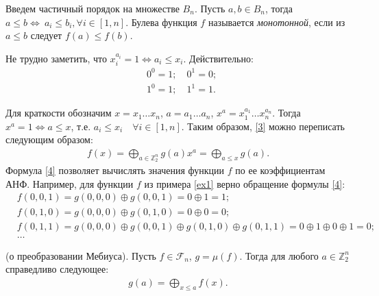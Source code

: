 Введем частичный порядок на множестве $B_n$. Пусть $a,b \in B_n$, тогда ${a} \leq {b} \Leftrightarrow \ a_i \leq b_i, \forall i \in [1,n]$.
Булева функция $f$ называется \textit{монотонной}, если из ${a}\leq {b}$ следует $f({a}) \leq f({b})$.

Не трудно заметить, что $x_i^{a_i} = 1 \Leftrightarrow a_i \leq x_i$. Действительно:
\begin{align*}
    &0^0 = 1;\quad0^1 =0;\\
    &1^0= 1;\quad 1^1=1.
\end{align*}

Для краткости обозначим $x = x_1\dots x_n$, $a = a_1 \dots a_n$, $x^a=x_1^{a_1} \dots x_n^{a_n}$.
Тогда $x^a = 1 \Leftrightarrow a \leq x$, т.е. $a_i \leq x_i \quad \forall i \in [1,n]$.
Таким образом, \eqref{3} можно переписать следующим образом:
\begin{align}
    f(x) = \bigoplus_{a \in \mathbb{Z}_2^n}g(a)x^a = \bigoplus_{a \leq x}g(a).
    \label{4}
\end{align}
Формула \eqref{4} позволяет вычислять значения функции $f$ по ее коэффициентам АНФ. Например, для функции $f$ из примера \ref{ex1} верно обращение формулы \eqref{4}:
\begin{align*}
    &f(0,0,1) = g(0,0,0) \oplus g(0,0,1) = 0 \oplus 1 = 1;\\
    &f(0,1,0) = g(0,0,0) \oplus g(0,1,0) = 0 \oplus 0 = 0;\\
    &f(0,1,1) = g(0,0,0) \oplus g(0,0,1) \oplus g(0,1,0) \oplus g(0,1,1) = 0 \oplus 1 \oplus 0 \oplus 1 = 0; \\
    &\dots
\end{align*}
\begin{theorem} (о преобразовании Мебиуса).
Пусть $f \in \mathcal{F}_n$, $g = \mu(f)$. Тогда для любого $a \in \mathbb{Z}_2^n$ справедливо следующее:
\begin{align}
    g(a) = \bigoplus_{x \leq a}f(x).
    \label{fmt}
\end{align}
\end{theorem}
